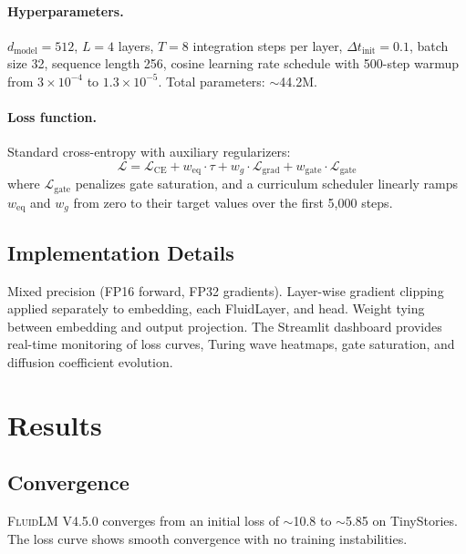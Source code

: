 \documentclass{article}
\newcommand{\fluidlm}{\textsc{FluidLM}}
\begin{document}
\paragraph{Hyperparameters.}
$d_{\text{model}} = 512$, $L = 4$ layers, $T = 8$ integration steps per layer, $\Delta t_{\text{init}} = 0.1$, batch size 32, sequence length 256, cosine learning rate schedule with 500-step warmup from $3 \times 10^{-4}$ to $1.3 \times 10^{-5}$. Total parameters: $\sim$44.2M.

\paragraph{Loss function.}
Standard cross-entropy with auxiliary regularizers:
\begin{equation}
\mathcal{L} = \mathcal{L}_{\text{CE}} + w_{\text{eq}} \cdot \tau + w_g \cdot \mathcal{L}_{\text{grad}} + w_{\text{gate}} \cdot \mathcal{L}_{\text{gate}}
\end{equation}
where $\mathcal{L}_{\text{gate}}$ penalizes gate saturation, and a curriculum scheduler linearly ramps $w_{\text{eq}}$ and $w_g$ from zero to their target values over the first 5,000 steps.

\subsection{Implementation Details}

Mixed precision (FP16 forward, FP32 gradients). Layer-wise gradient clipping applied separately to embedding, each FluidLayer, and head. Weight tying between embedding and output projection. The Streamlit dashboard provides real-time monitoring of loss curves, Turing wave heatmaps, gate saturation, and diffusion coefficient evolution.

\section{Results}
\label{sec:results}

\subsection{Convergence}

\fluidlm{} V4.5.0 converges from an initial loss of $\sim$10.8 to $\sim$5.85 on TinyStories. The loss curve shows smooth convergence with no training instabilities.
\end{document}
